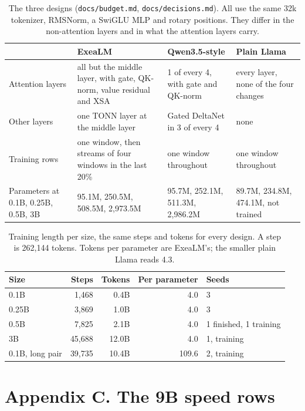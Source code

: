 \documentclass[11pt,letterpaper]{article}
\begin{document}
\begin{table}[H]
\centering\footnotesize
\caption{The three designs (\texttt{docs/budget.md}, \texttt{docs/decisions.md}). All use the same 32k tokenizer, RMSNorm, a SwiGLU MLP and rotary positions. They differ in the non-attention layers and in what the attention layers carry.}
\begin{tabularx}{\linewidth}{@{}l L L L@{}}
\toprule
& ExeaLM & Qwen3.5-style & Plain Llama \\
\midrule
Attention layers & all but the middle layer, with gate, QK-norm, value residual and XSA & 1 of every 4, with gate and QK-norm & every layer, none of the four changes \\
Other layers & one TONN layer at the middle layer & Gated DeltaNet in 3 of every 4 & none \\
Training rows & one window, then streams of four windows in the last 20\% & one window throughout & one window throughout \\
Parameters at 0.1B, 0.25B, 0.5B, 3B & 95.1M, 250.5M, 508.5M, 2,973.5M & 95.7M, 252.1M, 511.3M, 2,986.2M & 89.7M, 234.8M, 474.1M, not trained \\
\bottomrule
\end{tabularx}
\end{table}

\begin{table}[H]
\centering\footnotesize
\caption{Training length per size, the same steps and tokens for every design. A step is 262,144 tokens. Tokens per parameter are ExeaLM's; the smaller plain Llama reads 4.3.}
\begin{tabularx}{\linewidth}{@{}l r r r L@{}}
\toprule
Size & Steps & Tokens & Per parameter & Seeds \\
\midrule
0.1B & 1,468 & 0.4B & 4.0 & 3 \\
0.25B & 3,869 & 1.0B & 4.0 & 3 \\
0.5B & 7,825 & 2.1B & 4.0 & 1 finished, 1 training \\
3B & 45,688 & 12.0B & 4.0 & 1, training \\
0.1B, long pair & 39,735 & 10.4B & 109.6 & 2, training \\
\bottomrule
\end{tabularx}
\end{table}

\section*{Appendix C. The 9B speed rows}
\end{document}
